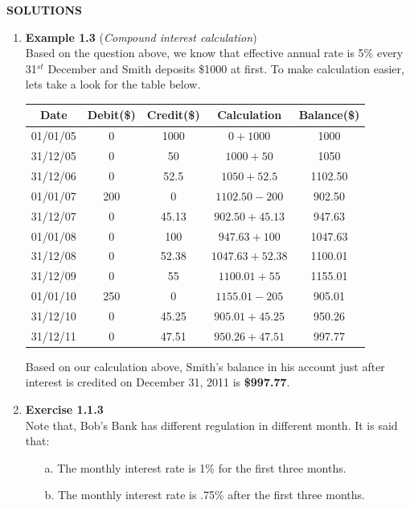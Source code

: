 \documentclass{article}
\begin{document}
	\pagebreak
	\begin{center}
		\textbf{SOLUTIONS}
	\end{center}
	\begin{enumerate}
		\item \textbf{Example 1.3} (\textit{Compound interest calculation})\\
		Based on the question above, we know that effective annual rate is 5\% every 31$^{st}$ December and Smith deposits \$1000 at first. To make calculation easier, lets take a look for the table below. 
		\begin{center}
			\begin{tabular}{|c|c|c|c|c|}
				\hline
				\textbf{Date}&\textbf{Debit}(\$)&\textbf{Credit}(\$)&\textbf{Calculation}&\textbf{Balance}(\$)\\\hline
				01/01/05&0&1000&$0+1000$&1000\\\hline
				31/12/05&0&50&$1000+50$&1050\\\hline
				31/12/06&0&52.5&$1050+52.5$&1102.50\\\hline
				01/01/07&200&0&$1102.50-200$&902.50\\\hline
				31/12/07&0&45.13&$902.50+45.13$&947.63\\\hline
				01/01/08&0&100&$947.63+100$&1047.63\\\hline
				31/12/08&0&52.38&$1047.63+52.38$&1100.01\\\hline
				31/12/09&0&55&$1100.01+55$&1155.01\\\hline
				01/01/10&250&0&$1155.01-205$&905.01\\\hline
				31/12/10&0&45.25&$905.01+45.25$&950.26\\\hline
				31/12/11&0&47.51&$950.26+47.51$&997.77\\\hline
			\end{tabular}
		\end{center}
		Based on our calculation above, Smith's balance in his account just after interest is credited on December 31, 2011 is \textbf{\$997.77}.
		\item \textbf{Exercise 1.1.3}\\
		Note that, Bob's Bank has different regulation in different month. It is said that:
		\begin{enumerate}
			\item[a.] The monthly interest rate is 1\% for the first three months.
			\item[b.] The monthly interest rate is .75\% after the first three months.
		\end{enumerate} 

\end{enumerate}
\end{document}
